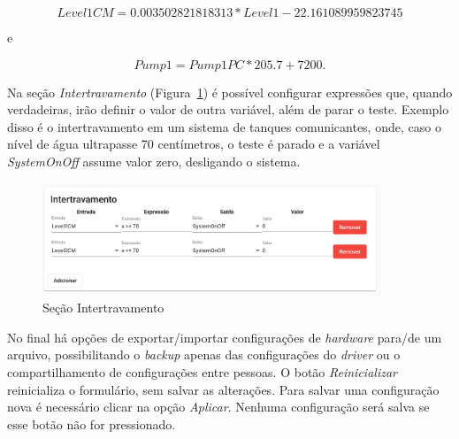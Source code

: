 \begin{equation*}
    Level1CM = 0.003502821818313*Level1 -22.161089959823745
\end{equation*}

e

\begin{equation*}
    Pump1 = Pump1PC * 205.7 + 7200.
\end{equation*}

Na seção \textit{Intertravamento} (Figura~\ref{fig:hardware5}) é possível
configurar expressões que, quando verdadeiras, irão definir o valor de outra
variável, além de parar o teste. Exemplo disso é o intertravamento em um sistema
de tanques comunicantes, onde, caso o nível de água ultrapasse 70 centímetros, o
teste é parado e a variável \textit{SystemOnOff} assume valor zero, desligando o
sistema.

\begin{figure}[ht!]
    \centering
    \includegraphics[width=0.9\textwidth]{imgs/hardware5}
    \caption[Seção Intertravamento]{Seção Intertravamento}%
    \label{fig:hardware5}
\end{figure}

No final há opções de exportar/importar configurações de \textit{hardware}
para/de um arquivo, possibilitando o \textit{backup} apenas das configurações do
\textit{driver} ou o compartilhamento de configurações entre pessoas. O botão
\textit{Reinicializar} reinicializa o formulário, sem salvar as alterações. Para
salvar uma configuração nova é necessário clicar na opção \textit{Aplicar}.
Nenhuma configuração será salva se esse botão não for pressionado.
